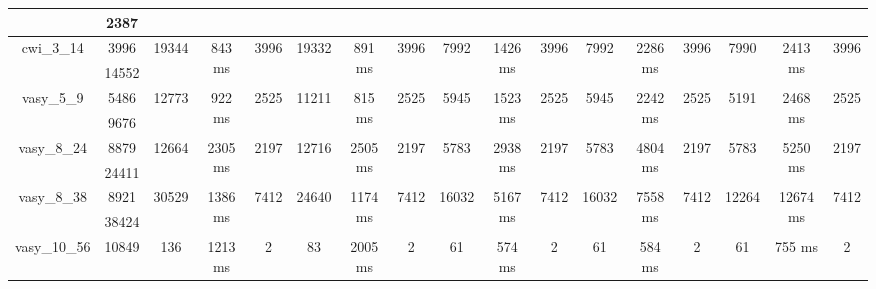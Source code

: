 \documentclass[../master/master.tex]{subfiles}
\begin{document}
\begin{center}
\begin{tabular}{ |c|c||c|c|c||c|c|c||c|c|c||c|c|c||c|c|c| }
\cline{2-2}
 & 2387  &  &  &  &  &  &  &  &  &  &  &  &  &  &  &  \\
\hline
\multirow{2}{4em}{cwi\_3\_14} & 3996 & \multirow{2}{4em}{19344} & \multirow{2}{4em}{843 ms} & \multirow{2}{4em}{3996} & \multirow{2}{4em}{19332} & \multirow{2}{4em}{891 ms} & \multirow{2}{4em}{3996} & \multirow{2}{4em}{7992} & \multirow{2}{4em}{1426 ms} & \multirow{2}{4em}{3996} & \multirow{2}{4em}{7992} & \multirow{2}{4em}{2286 ms} & \multirow{2}{4em}{3996} & \multirow{2}{4em}{7990} & \multirow{2}{4em}{2413 ms} & \multirow{2}{4em}{3996} \\
\cline{2-2}
 & 14552  &  &  &  &  &  &  &  &  &  &  &  &  &  &  &  \\
\hline
\multirow{2}{4em}{vasy\_5\_9} & 5486 & \multirow{2}{4em}{12773} & \multirow{2}{4em}{922 ms} & \multirow{2}{4em}{2525} & \multirow{2}{4em}{11211} & \multirow{2}{4em}{815 ms} & \multirow{2}{4em}{2525} & \multirow{2}{4em}{5945} & \multirow{2}{4em}{1523 ms} & \multirow{2}{4em}{2525} & \multirow{2}{4em}{5945} & \multirow{2}{4em}{2242 ms} & \multirow{2}{4em}{2525} & \multirow{2}{4em}{5191} & \multirow{2}{4em}{2468 ms} & \multirow{2}{4em}{2525} \\
\cline{2-2}
 & 9676  &  &  &  &  &  &  &  &  &  &  &  &  &  &  &  \\
\hline
\multirow{2}{4em}{vasy\_8\_24} & 8879 & \multirow{2}{4em}{12664} & \multirow{2}{4em}{2305 ms} & \multirow{2}{4em}{2197} & \multirow{2}{4em}{12716} & \multirow{2}{4em}{2505 ms} & \multirow{2}{4em}{2197} & \multirow{2}{4em}{5783} & \multirow{2}{4em}{2938 ms} & \multirow{2}{4em}{2197} & \multirow{2}{4em}{5783} & \multirow{2}{4em}{4804 ms} & \multirow{2}{4em}{2197} & \multirow{2}{4em}{5783} & \multirow{2}{4em}{5250 ms} & \multirow{2}{4em}{2197} \\
\cline{2-2}
 & 24411  &  &  &  &  &  &  &  &  &  &  &  &  &  &  &  \\
\hline
\multirow{2}{4em}{vasy\_8\_38} & 8921 & \multirow{2}{4em}{30529} & \multirow{2}{4em}{1386 ms} & \multirow{2}{4em}{7412} & \multirow{2}{4em}{24640} & \multirow{2}{4em}{1174 ms} & \multirow{2}{4em}{7412} & \multirow{2}{4em}{16032} & \multirow{2}{4em}{5167 ms} & \multirow{2}{4em}{7412} & \multirow{2}{4em}{16032} & \multirow{2}{4em}{7558 ms} & \multirow{2}{4em}{7412} & \multirow{2}{4em}{12264} & \multirow{2}{4em}{12674 ms} & \multirow{2}{4em}{7412} \\
\cline{2-2}
 & 38424  &  &  &  &  &  &  &  &  &  &  &  &  &  &  &  \\
\hline
\multirow{2}{4em}{vasy\_10\_56} & 10849 & \multirow{2}{4em}{136} & \multirow{2}{4em}{1213 ms} & \multirow{2}{4em}{2} & \multirow{2}{4em}{83} & \multirow{2}{4em}{2005 ms} & \multirow{2}{4em}{2} & \multirow{2}{4em}{61} & \multirow{2}{4em}{574 ms} & \multirow{2}{4em}{2} & \multirow{2}{4em}{61} & \multirow{2}{4em}{584 ms} & \multirow{2}{4em}{2} & \multirow{2}{4em}{61} & \multirow{2}{4em}{755 ms} & \multirow{2}{4em}{2} \\

\end{tabular}
\end{center}
\end{document}
